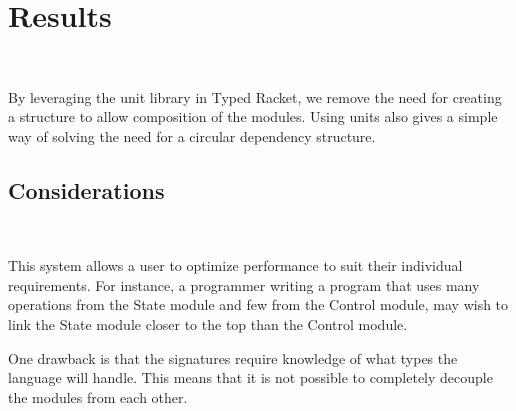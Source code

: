 
\section{Results}
~

By leveraging the unit library in Typed Racket, we remove the need for creating a structure to allow composition of the modules. Using units also gives a simple way of solving the need for a circular  dependency structure.

\subsection{Considerations}
~

This system allows a user to optimize performance to suit their individual requirements. For instance, a programmer writing a program that uses many operations from the State module and few from the Control module, may wish to link the State module closer to the top than the Control module.

One drawback is that the signatures require knowledge of what types the language will handle. This means that it is not possible to completely decouple the modules from each other.